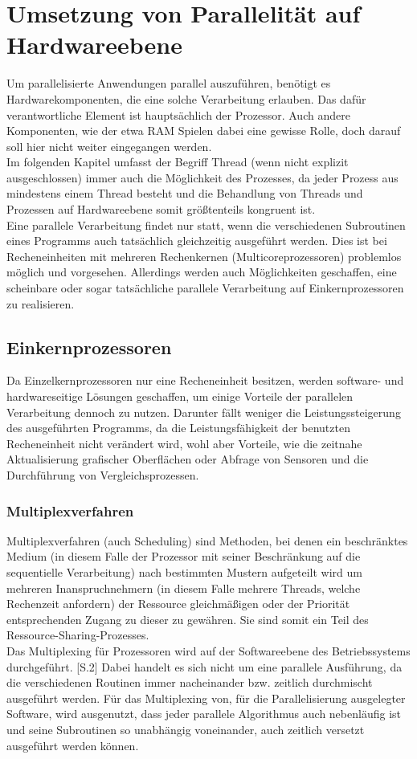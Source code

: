 \chapter{Umsetzung von Parallelität auf Hardwareebene}
Um parallelisierte Anwendungen parallel auszuführen, benötigt es Hardwarekomponenten, die eine solche Verarbeitung erlauben. Das dafür verantwortliche Element ist hauptsächlich der Prozessor. Auch andere Komponenten, wie der etwa \ac{RAM} Spielen dabei eine gewisse Rolle, doch darauf soll hier nicht weiter eingegangen werden.\\
Im folgenden Kapitel umfasst der Begriff Thread (wenn nicht explizit ausgeschlossen) immer auch die Möglichkeit des Prozesses, da jeder Prozess aus mindestens einem Thread besteht und die Behandlung von Threads und Prozessen auf Hardwareebene somit größtenteils kongruent ist.\\
Eine parallele Verarbeitung findet nur statt, wenn die verschiedenen Subroutinen eines Programms auch tatsächlich gleichzeitig ausgeführt werden. Dies ist bei Recheneinheiten mit mehreren Rechenkernen (Multicoreprozessoren) problemlos möglich und vorgesehen. Allerdings werden auch Möglichkeiten geschaffen, eine scheinbare oder sogar tatsächliche parallele Verarbeitung auf Einkernprozessoren zu realisieren.

\section{Einkernprozessoren}
Da Einzelkernprozessoren nur eine Recheneinheit besitzen, werden software- und hardwareseitige Lösungen geschaffen, um einige Vorteile der parallelen Verarbeitung dennoch zu nutzen. Darunter fällt weniger die Leistungssteigerung des ausgeführten Programms, da die Leistungsfähigkeit der benutzten Recheneinheit nicht verändert wird, wohl aber Vorteile, wie die zeitnahe Aktualisierung grafischer Oberflächen oder Abfrage von Sensoren und die Durchführung von Vergleichsprozessen.

\subsection{Multiplexverfahren} \label{multiplexing}
Multiplexverfahren (auch Scheduling) sind Methoden, bei denen ein beschränktes Medium (in diesem Falle der Prozessor mit seiner Beschränkung auf die sequentielle Verarbeitung) nach bestimmten Mustern aufgeteilt wird um mehreren Inanspruchnehmern (in diesem Falle mehrere Threads, welche Rechenzeit anfordern) der Ressource gleichmäßigen oder der Priorität entsprechenden Zugang zu dieser zu gewähren. \cite{ITWissen_Multiplexverfahren} Sie sind somit ein Teil des Ressource-Sharing-Prozesses.\\
Das Multiplexing für Prozessoren wird auf der Softwareebene des Betriebssystems durchgeführt. \cite{Assmus_Softwarestrukturen}[S.2] Dabei handelt es sich nicht um eine parallele Ausführung, da die verschiedenen Routinen immer nacheinander bzw. zeitlich durchmischt ausgeführt werden. Für das Multiplexing von, für die Parallelisierung ausgelegter Software, wird ausgenutzt, dass jeder parallele Algorithmus auch nebenläufig ist und seine Subroutinen so unabhängig voneinander, auch zeitlich versetzt ausgeführt werden können.

